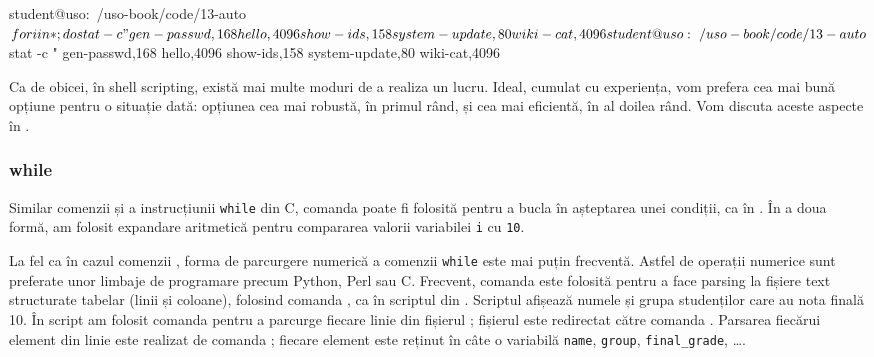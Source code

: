 \begin{screen}[caption={Alternativă la folosirea for},label={lst:auto:for-inefficient}]
student@uso:~/uso-book/code/13-auto$ for i in *; do stat -c "%
gen-passwd,168
hello,4096
show-ids,158
system-update,80
wiki-cat,4096

student@uso:~/uso-book/code/13-auto$ stat -c "%
gen-passwd,168
hello,4096
show-ids,158
system-update,80
wiki-cat,4096
\end{screen}

Ca de obicei, în shell scripting, există mai multe moduri de a realiza un lucru.
Ideal, cumulat cu experiența, vom prefera cea mai bună opțiune pentru o situație dată: opțiunea cea mai robustă, în primul rând, și cea mai eficientă, în al doilea rând.
Vom discuta aceste aspecte în .

\subsubsection{while}
\label{sec:auto:script-func:flow-control:while}

Similar comenzii  și a instrucțiunii \texttt{while} din C, comanda  poate fi folosită pentru a bucla în așteptarea unei condiții, ca în .
În a doua formă, am folosit expandare aritmetică pentru compararea valorii variabilei \texttt{i} cu \texttt{10}.


La fel ca în cazul comenzii , forma de parcurgere numerică a comenzii \texttt{while} este mai puțin frecventă.
Astfel de operații numerice sunt preferate unor limbaje de programare precum Python, Perl sau C.
Frecvent, comanda  este folosită pentru a face parsing la fișiere text structurate tabelar (linii și coloane), folosind comanda , ca în scriptul  din .
Scriptul afișează numele și grupa studenților care au nota finală 10.
În script am folosit comanda  pentru a parcurge fiecare linie din fișierul ; fișierul este redirectat către comanda .
Parsarea fiecărui element din linie este realizat de comanda ; fiecare element este reținut în câte o variabilă \texttt{name}, \texttt{group}, \texttt{final\_grade}, \ldots.

